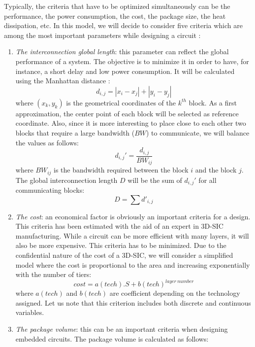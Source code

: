 Typically, the criteria that have to be optimized simultaneously can be the performance, the power consumption, the cost, the package size, the heat dissipation, etc. In this model, we will decide to consider five criteria which are among the most important parameters while designing a circuit \cite{DBLP:conf/3dic/MilojevicCCRRSAPM09}:
\begin{enumerate}
\item \textit{The interconnection global length}: this parameter can reflect the global performance of a system. The objective is to minimize it in order to have, for instance, a short delay and low power consumption. It will be calculated using the Manhattan distance \cite{mandist06}:
\begin{equation}
d_{i,j}=|x_i-x_j|+|y_i-y_j|
\end{equation}
where $(x_k, y_k)$ is the geometrical coordinates of the $k^{th}$ block. As a first approximation, the center point of each block will be selected as reference coordinate. Also, since it is more interesting to place close to each other two blocks that require a large bandwidth ($BW$) to communicate, we will balance the values as follows:
\begin{equation}
d_{i,j}'=\frac{d_{i,j}}{BW_{ij}}
\end{equation}
where $BW_{ij}$ is the bandwidth required between the block $i$ and the block $j$. The global interconnection length $D$ will be the sum of $d_{i,j}'$ for all communicating blocks:
\begin{equation}
D=\sum d'_{i,j}
\end{equation}
\item \textit{The cost}: an economical factor is obviously an important criteria for a design. This criteria has been estimated with the aid of an expert in 3D-SIC manufacturing. While a circuit can be more efficient with many layers, it will also be more expensive. This criteria has to be minimized. Due to the confidential nature of the cost of a 3D-SIC, we will consider a simplified model where the cost is proportional to the area and increasing exponentially with the number of tiers:
\begin{equation}
cost=a(tech).S+b(tech)^{layer~number}
\label{eqn:cost}
\end{equation}
where $a(tech)$ and $b(tech)$ are coefficient depending on the technology assigned.
Let us note that this criterion includes both discrete and continuous variables.
\item \textit{The package volume}: this can be an important criteria when designing embedded circuits. The package volume is calculated as follows:

\end{enumerate}

